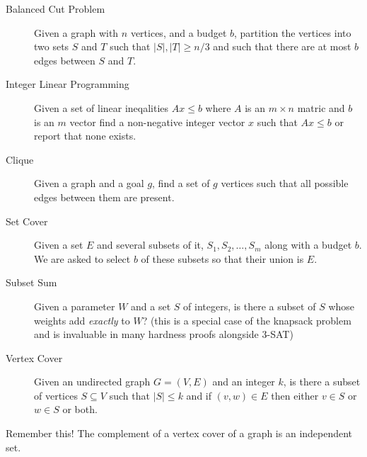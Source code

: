 \begin{description}
\item[{Balanced Cut Problem}] Given a graph with \(n\) vertices, and a budget \(b\), partition the 
vertices into two sets \(S\) and \(T\) such that \(|S|, |T| \geq n/3\) and such that there are 
at most \(b\) edges between \(S\) and \(T\).

\item[{Integer Linear Programming}] Given a set of linear ineqalities \(Ax \leq b\) where \(A\) is 
an \(m\times n\) matric and \(b\) is an \(m\) vector find  a non-negative integer vector \(x\) 
such that \(Ax \leq b\) or report that none exists.

\item[{Clique}] Given a graph and a goal \(g\), find a set of \(g\) vertices 
such that all possible edges between them are present.

\item[{Set Cover}] Given a set \(E\) and several subsets of it, \(S_1, S_2, \ldots, S_m\) along with a 
budget \(b\). We are asked to select \(b\) of these subsets so that their
union is \(E\).

\item[{Subset Sum}] Given a parameter \(W\) and a set \(S\) of integers, is there a subset of \(S\) 
whose weights add \emph{exactly} to \(W\)? (this is a special case of the knapsack problem and is 
invaluable in many hardness proofs alongside 3-SAT)

\item[{Vertex Cover}] Given an undirected graph \(G=(V,E)\) and an integer \(k\), is there a subset 
of vertices \(S \subseteq V\) such that \(|S| \leq k\) and if \((v,w) \in E\) 
then either \(v \in S\) or \(w \in S\) or both.
\end{description}
Remember this! The complement of a vertex cover of a graph is an independent set. 

